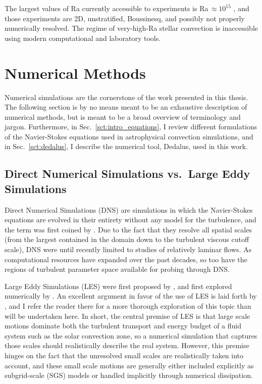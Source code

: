 The largest values of Ra currently accessible to experiments is Ra$\,\approx 10^{15}$ \citep{zhu&all2018}, and those experiments are 2D, unstratified, Boussinesq, and possibly not properly numerically resolved.
The regime of very-high-Ra stellar convection is inaccessible using modern computational and laboratory tools.


\section{Numerical Methods}
\label{sct:numerics}
Numerical simulations are the cornerstone of the work presented in this thesis.
The following section is by no means meant to be an exhaustive description of numerical methods, but is meant to be a broad overview of terminology and jargon.
Furthermore, in Sec.~\ref{sct:intro_equations}, I review different formulations of the Navier-Stokes equations used in astrophysical convection simulations, and in Sec.~\ref{sct:dedalus}, I describe the numerical tool, Dedalus, used in this work. 

\subsection{Direct Numerical Simulations vs.~Large Eddy Simulations}
Direct Numerical Simulations (DNS) are simulations in which the Navier-Stokes equations are evolved in their entirety without any model for the turbulence, and the term was first coined by \citet{orszag1970}.
Due to the fact that they resolve all spatial scales (from the largest contained in the domain down to the turbulent viscous cutoff scale), DNS were until recently limited to studies of relatively laminar flows.
As computational resources have expanded over the past decades, so too have the regions of turbulent parameter space available for probing through DNS.


Large Eddy Simulations (LES) were first proposed by \cite{smagorinsky1963}, and first explored numerically by \citet{deardorff1970}.
An excellent argument in favor of the use of LES is laid forth by \citet{miesch&all2015}, and I refer the reader there for a more thorough exploration of this topic than will be undertaken here.
In short, the central premise of LES is that large scale motions dominate both the turbulent transport and energy budget of a fluid system such as the solar convection zone, so a numerical simulation that captures those scales should realistically describe the real system.
However, this premise hinges on the fact that the unresolved small scales are realistically taken into account, and these small scale motions are generally either included explicitly as subgrid-scale (SGS) models or handled implicitly through numerical dissipation.

